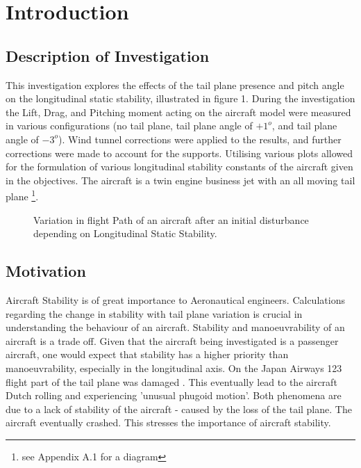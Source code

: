 \section{Introduction}

\subsection{Description of Investigation}
This investigation explores the effects of the tail plane presence and pitch angle on the longitudinal static stability, illustrated in figure 1. During the investigation the Lift, Drag, and Pitching moment acting on the aircraft model were measured in various configurations (no tail plane, tail plane angle of $+1^o$, and tail plane angle of $-3^o$). Wind tunnel corrections were applied to the results, and further corrections were made to account for the supports. Utilising various plots allowed for the formulation of various longitudinal stability constants of the aircraft given in the objectives. The aircraft is a twin engine business jet with an all moving tail plane \footnote{see Appendix A.1 for a diagram}. 
\begin{center}  
  \begin{figure}[h]
    \centering 
    \caption{Variation in flight Path of an aircraft after an initial disturbance depending on Longitudinal Static Stability.}
  \end{figure}
\end{center}

\subsection{Motivation}
Aircraft Stability is of great importance to Aeronautical engineers. Calculations regarding the change in stability with tail plane variation is crucial in understanding the behaviour of an aircraft. Stability and manoeuvrability of an aircraft is a trade off. Given that the aircraft being investigated is a passenger aircraft, one would expect that stability has a higher priority than manoeuvrability, especially in the longitudinal axis. 
\vspace{0.2cm}
\newline 
On the Japan Airways 123 flight part of the tail plane was damaged \cite{1}. This eventually lead to the aircraft Dutch rolling and experiencing 'unusual phugoid motion'. Both phenomena are due to a lack of stability of the aircraft - caused by the loss of the tail plane. The aircraft eventually crashed. This stresses the importance of aircraft stability. 

